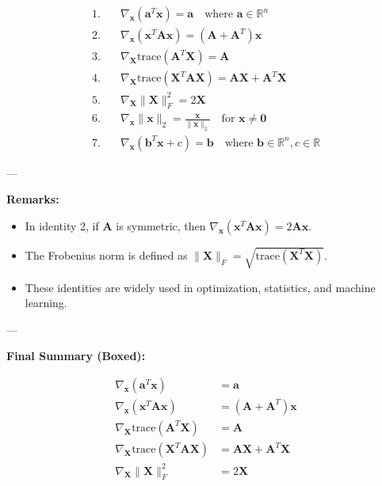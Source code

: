 \begin{align*}
1.\quad & \nabla_{\mathbf{x}} (\mathbf{a}^T \mathbf{x}) = \mathbf{a} \quad \text{where } \mathbf{a} \in \mathbb{R}^n \\
2.\quad & \nabla_{\mathbf{x}} (\mathbf{x}^T \mathbf{A} \mathbf{x}) = (\mathbf{A} + \mathbf{A}^T) \mathbf{x} \\
3.\quad & \nabla_{\mathbf{X}} \mathrm{trace}(\mathbf{A}^T \mathbf{X}) = \mathbf{A} \\
4.\quad & \nabla_{\mathbf{X}} \mathrm{trace}(\mathbf{X}^T \mathbf{A} \mathbf{X}) = \mathbf{A} \mathbf{X} + \mathbf{A}^T \mathbf{X} \\
5.\quad & \nabla_{\mathbf{X}} \| \mathbf{X} \|_F^2 = 2 \mathbf{X} \\
6.\quad & \nabla_{\mathbf{x}} \| \mathbf{x} \|_2 = \frac{\mathbf{x}}{\|\mathbf{x}\|_2} \quad \text{for } \mathbf{x} \neq \mathbf{0} \\
7.\quad & \nabla_{\mathbf{x}} (\mathbf{b}^T \mathbf{x} + c) = \mathbf{b} \quad \text{where } \mathbf{b} \in \mathbb{R}^n, c \in \mathbb{R}
\end{align*}

---

\textbf{Remarks:}
\begin{itemize}
    \item In identity 2, if \( \mathbf{A} \) is symmetric, then \( \nabla_{\mathbf{x}} (\mathbf{x}^T \mathbf{A} \mathbf{x}) = 2 \mathbf{A} \mathbf{x} \).
    \item The Frobenius norm is defined as \( \| \mathbf{X} \|_F = \sqrt{\mathrm{trace}(\mathbf{X}^T \mathbf{X})} \).
    \item These identities are widely used in optimization, statistics, and machine learning.
\end{itemize}

---

\textbf{Final Summary (Boxed):}

\[
\boxed{
\begin{aligned}
\nabla_{\mathbf{x}} (\mathbf{a}^T \mathbf{x}) &= \mathbf{a} \\
\nabla_{\mathbf{x}} (\mathbf{x}^T \mathbf{A} \mathbf{x}) &= (\mathbf{A} + \mathbf{A}^T) \mathbf{x} \\
\nabla_{\mathbf{X}} \mathrm{trace}(\mathbf{A}^T \mathbf{X}) &= \mathbf{A} \\
\nabla_{\mathbf{X}} \mathrm{trace}(\mathbf{X}^T \mathbf{A} \mathbf{X}) &= \mathbf{A} \mathbf{X} + \mathbf{A}^T \mathbf{X} \\
\nabla_{\mathbf{X}} \| \mathbf{X} \|_F^2 &= 2 \mathbf{X}
\end{aligned}
}
\]


